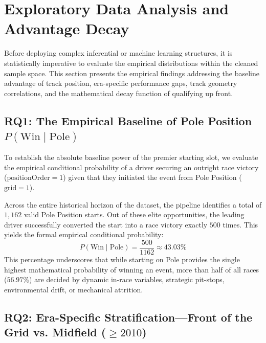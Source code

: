 \section{Exploratory Data Analysis and Advantage Decay}
\label{sec:eda}

Before deploying complex inferential or machine learning structures, it is statistically imperative to evaluate the empirical distributions within the cleaned sample space. This section presents the empirical findings addressing the baseline advantage of track position, era-specific performance gaps, track geometry correlations, and the mathematical decay function of qualifying up front.

\subsection{RQ1: The Empirical Baseline of Pole Position $P(\text{Win} \mid \text{Pole})$}
\label{subsec:rq1_pole}

To establish the absolute baseline power of the premier starting slot, we evaluate the empirical conditional probability of a driver securing an outright race victory ($\text{positionOrder} = 1$) given that they initiated the event from Pole Position ($\text{grid} = 1$). 

Across the entire historical horizon of the dataset, the pipeline identifies a total of $1,162$ valid Pole Position starts. Out of these elite opportunities, the leading driver successfully converted the start into a race victory exactly $500$ times. This yields the formal empirical conditional probability:
\begin{equation}
P(\text{Win} \mid \text{Pole}) = \frac{500}{1162} \approx 43.03\%
\end{equation}
This percentage underscores that while starting on Pole provides the single highest mathematical probability of winning an event, more than half of all races ($56.97\%$) are decided by dynamic in-race variables, strategic pit-stops, environmental drift, or mechanical attrition.

\subsection{RQ2: Era-Specific Stratification—Front of the Grid vs. Midfield ($\ge 2010$)}
\label{subsec:rq2_eras}

